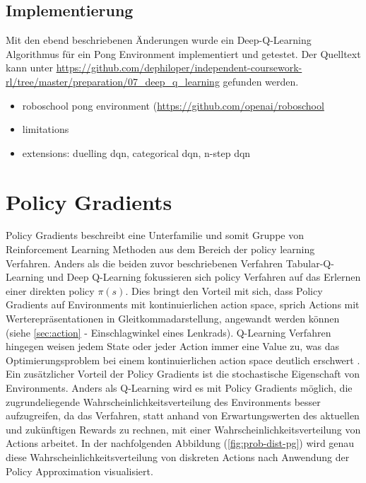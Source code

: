 \documentclass[11pt]{scrartcl}
\begin{document}
\subsection{Implementierung}
Mit den ebend beschriebenen Änderungen wurde ein Deep-Q-Learning Algorithmus für ein Pong
Environment implementiert und getestet. Der Quelltext kann unter
\url{https://github.com/dephiloper/independent-coursework-rl/tree/master/preparation/07_deep_q_learning}
gefunden werden.


\begin{itemize}
\itemsep0pt
\item roboschool pong environment (\url{https://github.com/openai/roboschool}
\item limitations
\item extensions: duelling dqn, categorical dqn, n-step dqn
\end{itemize}
\newpage


\section{Policy Gradients}
Policy Gradients beschreibt eine Unterfamilie und somit Gruppe von Reinforcement Learning 
Methoden aus dem Bereich der policy learning Verfahren. Anders als die beiden zuvor
beschriebenen Verfahren Tabular-Q-Learning und Deep Q-Learning fokussieren sich policy
Verfahren auf das Erlernen einer direkten policy $\pi(s)$. Dies bringt den Vorteil mit sich,
dass Policy Gradients auf Environments mit kontinuierlichen action space, sprich Actions mit
Werterepräsentationen in Gleitkommadarstellung, angewandt werden können (siehe
\ref{sec:action}  - Einschlagwinkel eines Lenkrads). Q-Learning Verfahren
hingegen weisen jedem State oder jeder Action immer eine Value zu, was das Optimierungsproblem
bei einem kontinuierlichen action space deutlich erschwert \cite[~S.242]{L2018}. Ein
zusätzlicher Vorteil der Policy Gradients ist die stochastische Eigenschaft von Environments.
Anders als Q-Learning wird es mit Policy Gradients möglich, die zugrundeliegende
Wahrscheinlichkeitsverteilung des Environments besser aufzugreifen, da das Verfahren, statt
anhand von Erwartungswerten des aktuellen und zukünftigen Rewards zu rechnen, mit einer
Wahrscheinlichkeitsverteilung von Actions arbeitet. In der nachfolgenden Abbildung 
(\ref{fig:prob-dist-pg}) wird genau diese Wahrscheinlichkeitsverteilung von diskreten Actions
nach Anwendung der Policy Approximation visualisiert.
\end{document}
